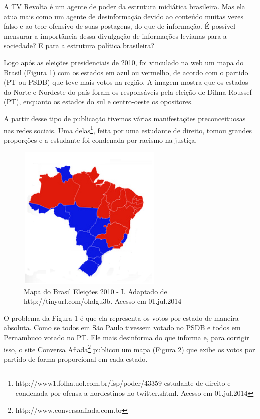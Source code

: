 \documentclass[
	article,			%
	12pt,				%
	oneside,			%
	a4paper,			%
	english,			%
	brazil,				%
	]{abntex2}
\begin{document}
A TV Revolta é um agente de poder da estrutura midiática brasileira. Mas ela atua mais como um agente de desinformação devido ao conteúdo muitas vezes falso e ao teor ofensivo de suas postagens, do que de informação. É possível mensurar a importância dessa divulgação de informações levianas para a sociedade? E para a estrutura política brasileira?

Logo após as eleições presidenciais de 2010, foi vinculado na web um mapa do Brasil (Figura 1) com os estados em azul ou vermelho, de acordo com o partido (PT ou PSDB) que teve mais votos na região. A imagem mostra que os estados do Norte e Nordeste do país foram os responsáveis pela eleição de Dilma Roussef (PT), enquanto os estados do sul e centro-oeste os opositores.

A partir desse tipo de publicação tivemos várias manifestações preconceituosas nas redes sociais. Uma delas\footnote{http://www1.folha.uol.com.br/fsp/poder/43359-estudante-de-direito-e-condenada-por-ofensa-a-nordestinos-no-twitter.shtml. Acesso em 01.jul.2014}, feita por uma estudante de direito, tomou grandes proporções e a estudante foi condenada por racismo na justiça. 

\begin{figure}[ht!]
\centering
\includegraphics[width=70mm,height=70mm]{mapa_1.png}
\caption{Mapa do Brasil Eleições 2010 - I. Adaptado de http://tinyurl.com/ohdgu3b. Acesso em 01.jul.2014}
\label{overflow}
\end{figure}

O problema da Figura 1 é que ela representa os votos por estado de maneira absoluta. Como se todos em São Paulo tivessem votado no PSDB e todos em Pernambuco votado no PT. Ele mais desinforma do que informa e, para corrigir isso, o site Conversa Afiada\footnote{http://www.conversaafiada.com.br} publicou um mapa (Figura 2) que exibe os votos por partido de forma proporcional em cada estado.
\end{document}
